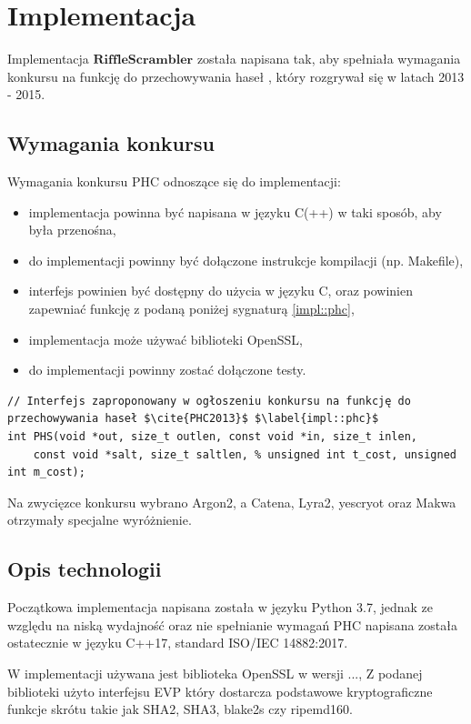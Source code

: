 \chapter{Implementacja}
\thispagestyle{chapterBeginStyle}

Implementacja $\mathbf{RiffleScrambler}$ została napisana tak, aby spełniała wymagania konkursu na funkcję do przechowywania haseł \cite[PHC, ang \textit{Password Hashing Competition}]{PHC2013}, który rozgrywał się w latach 2013 - 2015.

\section{Wymagania konkursu}
Wymagania konkursu PHC odnoszące się do implementacji:
\begin{itemize}
	\item implementacja powinna być napisana w języku C(++) w taki sposób, aby była przenośna,
	\item do implementacji powinny być dołączone instrukcje kompilacji (np. Makefile),
	\item interfejs powinien być dostępny do użycia w języku C, oraz powinien zapewniać funkcję z podaną poniżej sygnaturą \ref{impl::phc},
	\item implementacja może używać biblioteki OpenSSL,
	\item do implementacji powinny zostać dołączone testy.
\end{itemize}

\begin{verbatim}
// Interfejs zaproponowany w ogłoszeniu konkursu na funkcję do przechowywania haseł $\cite{PHC2013}$ $\label{impl::phc}$
int PHS(void *out, size_t outlen, const void *in, size_t inlen,
	const void *salt, size_t saltlen, % unsigned int t_cost, unsigned int m_cost); 
\end{verbatim}

Na zwycięzce konkursu wybrano Argon2, a Catena, Lyra2, yescryot oraz Makwa otrzymały specjalne wyróżnienie.

\section{Opis technologii}
Początkowa implementacja napisana została w języku Python 3.7, jednak ze względu na niską wydajność oraz nie spełnianie wymagań PHC napisana została ostatecznie w języku C++17, standard ISO/IEC 14882:2017.

W implementacji używana jest biblioteka OpenSSL w wersji ...,
Z podanej biblioteki użyto interfejsu EVP który dostarcza podstawowe kryptograficzne funkcje skrótu takie jak SHA2, SHA3, blake2s czy ripemd160.


